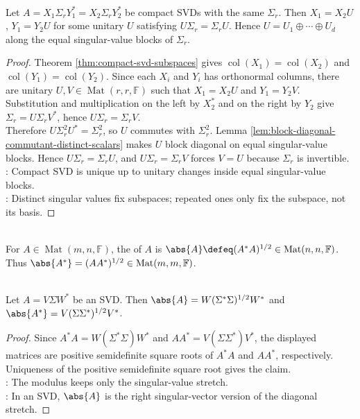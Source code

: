 \begin{theorem} \label{thm:compact-svd-unitary-ambiguity} \\
Let $A=X_1\Sigma_rY_1^*=X_2\Sigma_rY_2^*$ be compact SVDs with the same $\Sigma_r$. Then $X_1=X_2U$, $Y_1=Y_2U$ for some unitary $U$ satisfying $U\Sigma_r=\Sigma_rU$. Hence $U=U_1\oplus\cdots\oplus U_d$ along the equal singular-value blocks of $\Sigma_r$.
\begin{proof}
Theorem \ref{thm:compact-svd-subspaces} gives $\operatorname{col}(X_1)=\operatorname{col}(X_2)$ and $\operatorname{col}(Y_1)=\operatorname{col}(Y_2)$. Since each $X_i$ and $Y_i$ has orthonormal columns, there are unitary $U,V\in\operatorname{Mat}(r,r,\mathbb{F})$ such that $X_1=X_2U$ and $Y_1=Y_2V$. Substitution and multiplication on the left by $X_2^*$ and on the right by $Y_2$ give $\Sigma_r=U\Sigma_rV^*$, hence $U\Sigma_r=\Sigma_rV$.\\
Therefore $U\Sigma_r^2U^*=\Sigma_r^2$, so $U$ commutes with $\Sigma_r^2$. Lemma \ref{lem:block-diagonal-commutant-distinct-scalars} makes $U$ block diagonal on equal singular-value blocks. Hence $U\Sigma_r=\Sigma_rU$, and $U\Sigma_r=\Sigma_rV$ forces $V=U$ because $\Sigma_r$ is invertible.\\
: Compact SVD is unique up to unitary changes inside equal singular-value blocks.\\
: Distinct singular values fix subspaces; repeated ones only fix the subspace, not its basis.
\end{proof}
\end{theorem}

\begin{definition} \label{def:matrix-modulus} \\
For $A\in\operatorname{Mat}(m,n,\mathbb{F})$, the  of $A$ is $\abs{A}\defeq(A^*A)^{1/2}\in\operatorname{Mat}(n,n,\mathbb{F})$.\\
Thus $\abs{A^*}=(AA^*)^{1/2}\in\operatorname{Mat}(m,m,\mathbb{F})$.
\end{definition}

\begin{proposition} \label{prop:matrix-modulus-from-svd} \\
Let $A=V\Sigma W^*$ be an SVD. Then $\abs{A}=W(\Sigma^*\Sigma)^{1/2}W^*$ and $\abs{A^*}=V(\Sigma\Sigma^*)^{1/2}V^*$.
\begin{proof}
Since $A^*A=W(\Sigma^*\Sigma)W^*$ and $AA^*=V(\Sigma\Sigma^*)V^*$, the displayed matrices are positive semidefinite square roots of $A^*A$ and $AA^*$, respectively. Uniqueness of the positive semidefinite square root gives the claim.\\
: The modulus keeps only the singular-value stretch.\\
: In an SVD, $\abs{A}$ is the right singular-vector version of the diagonal stretch.
\end{proof}
\end{proposition}

